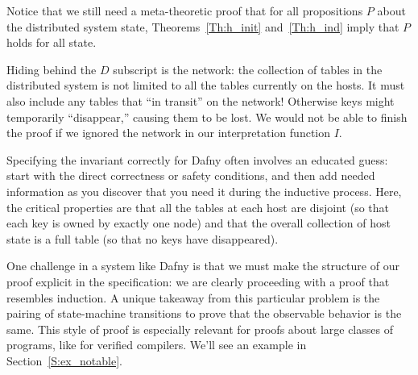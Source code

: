 Notice that we still need a meta-theoretic proof that for all propositions \(P\)
about the distributed system state, Theorems~\ref{Th:h_init} and~\ref{Th:h_ind}
imply that \(P\) holds for all state.

\begin{rem}
    Hiding behind the \(D\) subscript is the network: the collection of tables
    in the distributed system is not limited to all the tables currently on the
    hosts. It must also include any tables that ``in transit'' on the network!
    Otherwise keys might temporarily ``disappear,'' causing them to be lost. We
    would not be able to finish the proof if we ignored the network in our
    interpretation function \(I\).
\end{rem}

Specifying the invariant correctly for Dafny often involves an educated guess:
start with the direct correctness or safety conditions, and then add needed
information as you discover that you need it during the inductive process. Here,
the critical properties are that all the tables at each host are disjoint (so
that each key is owned by exactly one node) and that the overall collection of
host state is a full table (so that no keys have disappeared).

One challenge in a system like Dafny is that we must make the structure of our
proof explicit in the specification: we are clearly proceeding with a proof that
resembles induction. A unique takeaway from this particular problem is the
pairing of state-machine transitions to prove that the observable behavior is
the same. This style of proof is especially relevant for proofs about large
classes of programs, like for verified compilers. We'll see an example in
Section~\ref{S:ex_notable}.

